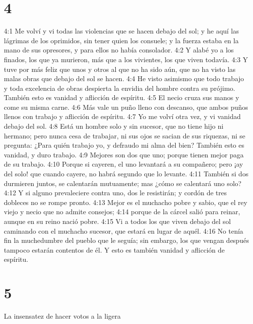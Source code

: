 \chapter{4}


4:1 Me volví y vi todas las violencias que se hacen debajo del sol; y he aquí las lágrimas de los oprimidos, sin tener quien los consuele; y la fuerza estaba en la mano de sus opresores, y para ellos no había consolador.  
4:2 Y alabé yo a los finados, los que ya murieron, más que a los vivientes, los que viven todavía.  
4:3 Y tuve por más feliz que unos y otros al que no ha sido aún, que no ha visto las malas obras que debajo del sol se hacen.  
4:4 He visto asimismo que todo trabajo y toda excelencia de obras despierta la envidia del hombre contra su prójimo. También esto es vanidad y aflicción de espíritu.  
4:5 El necio cruza sus manos y come su misma carne.  
4:6 Más vale un puño lleno con descanso, que ambos puños llenos con trabajo y aflicción de espíritu.  
4:7 Yo me volví otra vez, y vi vanidad debajo del sol.  
4:8 Está un hombre solo y sin sucesor, que no tiene hijo ni hermano; pero nunca cesa de trabajar, ni sus ojos se sacian de sus riquezas, ni se pregunta: ¿Para quién trabajo yo, y defraudo mi alma del bien? También esto es vanidad, y duro trabajo.  
4:9 Mejores son dos que uno; porque tienen mejor paga de su trabajo.  
4:10 Porque si cayeren, el uno levantará a su compañero; pero ¡ay del solo! que cuando cayere, no habrá segundo que lo levante.  
4:11 También si dos durmieren juntos, se calentarán mutuamente; mas ¿cómo se calentará uno solo?  
4:12 Y si alguno prevaleciere contra uno, dos le resistirán; y cordón de tres dobleces no se rompe pronto.  
4:13 Mejor es el muchacho pobre y sabio, que el rey viejo y necio que no admite consejos;  
4:14 porque de la cárcel salió para reinar, aunque en su reino nació pobre.  
4:15 Vi a todos los que viven debajo del sol caminando con el muchacho sucesor, que estará en lugar de aquél.  
4:16 No tenía fin la muchedumbre del pueblo que le seguía; sin embargo, los que vengan después tampoco estarán contentos de él. Y esto es también vanidad y aflicción de espíritu.  

\chapter{5}

La insensatez de hacer votos a la ligera  

